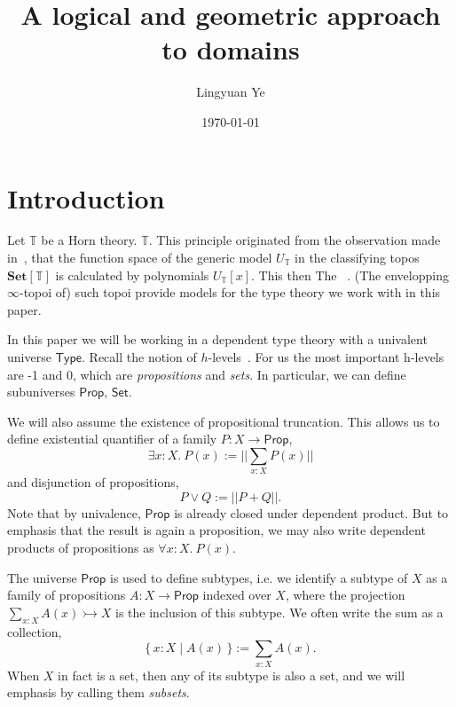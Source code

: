\documentclass[12pt]{amsart}
\title{A logical and geometric approach to domains}
\author{Lingyuan Ye}
\date{\today}
\theoremstyle{definition}
\newcommand{\mb}[1]{\mathbf{#1}}
\newcommand{\mbb}[1]{\mathbb{#1}}
\newcommand{\T}{\mbb T}
\newcommand{\ms}[1]{\mathsf{#1}}
\newcommand{\Set}{\mb{Set}}
\newcommand{\scomp}[2]{\{\,#1\mid#2\,\}}
\newcommand{\inj}{\rightarrowtail}
\newcommand{\fa}[2]{\forall #1\!\colon\!\!#2.\ }
\newcommand{\ex}[2]{\exists #1\!\colon\!\!#2.\ }
\newcommand{\pss}[1]{||#1||} %
\newcommand{\tp}{\ms{Type}}
\newcommand{\pp}{\ms{Prop}}
\newcommand{\st}{\ms{Set}}
\begin{document}
%

%
%

%
%

%
\maketitle              %
%
\tableofcontents

\section{Introduction}

Let $\T$ be a Horn theory.  $\T$. This principle originated from the observation made in~\cite{RN879}, that the function space of the generic model $U_\T$ in the classifying topos $\Set[\T]$ is calculated by polynomials $U_\T[x]$. This then  The  ~\cite{blechschmidt2021using,blechschmidt2020general}. (The envelopping $\infty$-topoi of) such topoi provide models for the type theory we work with in this paper.

In this paper we will be working in a dependent type theory with a univalent universe $\tp$. Recall the notion of $h$-levels~\cite{hottbook}. For us the most important h-levels are -1 and 0, which are \emph{propositions} and \emph{sets}. In particular, we can define subuniverses $\pp$, $\st$.

We will also assume the existence of propositional truncation. This allows us to define existential quantifier of a family $P : X \to \pp$, 
\[ \ex x{X} P(x) := \pss{\sum_{x:X}P(x)} \] 
and disjunction of propositions,
\[ P \vee Q := \pss{P + Q}. \]
Note that by univalence, $\pp$ is already closed under dependent product. But to emphasis that the result is again a proposition, we may also write dependent products of propositions as $\fa xX P(x)$. 

The universe $\pp$ is used to define subtypes, i.e. we identify a subtype of $X$ as a family of propositions $A : X \to \pp$ indexed over $X$, where the projection $\sum_{x:X}A(x) \inj X$ is the inclusion of this subtype. We often write the sum as a collection,
\[ \scomp{x:X}{A(x)} := \sum_{x:X}A(x). \]
When $X$ in fact is a set, then any of its subtype is also a set, and we will emphasis by calling them \emph{subsets}.
\end{document}
